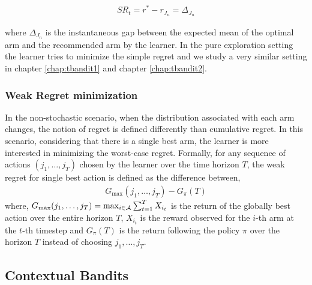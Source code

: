 \begin{align*}
SR_{t} = r^* - r_{J_{n}} = \Delta_{J_n}
\end{align*}

where $\Delta_{J_n}$ is the instantaneous gap between the expected mean of the optimal arm and the recommended arm by the learner. In the pure exploration setting the learner tries to minimize the simple regret and we study a very similar setting in chapter \ref{chap:tbandit1} and chapter \ref{chap:tbandit2}. 

\subsubsection{Weak Regret minimization}
In the non-stochastic scenario, when the distribution associated with each arm changes, the notion of regret is defined differently than cumulative regret. In this scenario, considering that there is a single best arm, the learner is more interested in minimizing the worst-case regret. Formally, for any sequence of actions $\left( j_1, \ldots , j_T \right)$ chosen by the learner over the time horizon $T$, the weak regret for single best action is defined as the difference between,
\begin{align*}
G_{\max}(j_1,\ldots,j_T) - G_{\pi}(T)
\end{align*}
where, $G_{\max}(j_1,\ldots,j_T) = \max_{i\in\mathcal{A}}\sum_{t=1}^{T}X_{i_t}$ is the return of the globally best action over the entire horizon $T$, $X_{i_t}$ is the reward observed for the $i$-th arm at the $t$-th timestep and $G_{\pi}(T)$ is the return following the policy $\pi$ over the horizon $T$ instead of choosing $j_1,\ldots,j_T$.

\subsection{Contextual Bandits}

